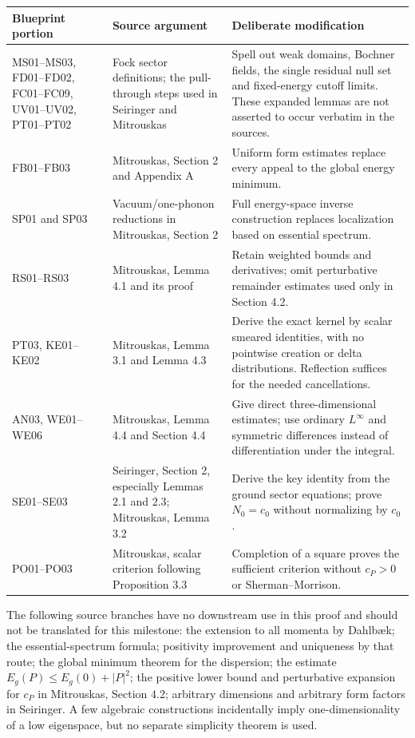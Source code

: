 \documentclass[11pt,a4paper]{article}
\theoremstyle{remark}\newtheorem{remark}[theorem]{Remark}
\newcommand{\abs}[1]{\lvert #1\rvert}\newcommand{\rankone}[2]{\lvert #1\rangle\langle #2\rvert}
\begin{document}
\begin{longtable}{>{\raggedright\arraybackslash}p{}>{\raggedright\arraybackslash}p{}>{\raggedright\arraybackslash}p{}}
\toprule
Blueprint portion & Source argument & Deliberate modification\\
\midrule\endhead
MS01--MS03, FD01--FD02, FC01--FC09, UV01--UV02, PT01--PT02 & Fock sector definitions; the pull-through steps used in Seiringer and Mitrouskas & Spell out weak domains, Bochner fields, the single residual null set and fixed-energy cutoff limits. These expanded lemmas are not asserted to occur verbatim in the sources.\\
FB01--FB03 & Mitrouskas, Section 2 and Appendix A & Uniform form estimates replace every appeal to the global energy minimum.\\
SP01 and SP03 & Vacuum/one-phonon reductions in Mitrouskas, Section 2 & Full energy-space inverse construction replaces localization based on essential spectrum.\\
RS01--RS03 & Mitrouskas, Lemma 4.1 and its proof & Retain weighted bounds and derivatives; omit perturbative remainder estimates used only in Section 4.2.\\
PT03, KE01--KE02 & Mitrouskas, Lemma 3.1 and Lemma 4.3 & Derive the exact kernel by scalar smeared identities, with no pointwise creation or delta distributions. Reflection suffices for the needed cancellations.\\
AN03, WE01--WE06 & Mitrouskas, Lemma 4.4 and Section 4.4 & Give direct three-dimensional estimates; use ordinary $L^\infty$ and symmetric differences instead of differentiation under the integral.\\
SE01--SE03 & Seiringer, Section 2, especially Lemmas 2.1 and 2.3; Mitrouskas, Lemma 3.2 & Derive the key identity from the ground sector equations; prove $N_0=c_0$ without normalizing by $c_0$.\\
PO01--PO03 & Mitrouskas, scalar criterion following Proposition 3.3 & Completion of a square proves the sufficient criterion without $c_P>0$ or Sherman--Morrison.\\
\bottomrule
\end{longtable}

The following source branches have no downstream use in this proof and should not be translated for this milestone: the extension to all momenta by Dahlb\ae k; the essential-spectrum formula; positivity improvement and uniqueness by that route; the global minimum theorem for the dispersion; the estimate $E_g(P)\leq E_g(0)+\abs P^2$; the positive lower bound and perturbative expansion for $c_P$ in Mitrouskas, Section 4.2; arbitrary dimensions and arbitrary form factors in Seiringer. A few algebraic constructions incidentally imply one-dimensionality of a low eigenspace, but no separate simplicity theorem is used.
\end{document}
